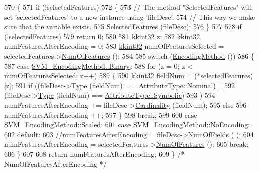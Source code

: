 \begin{DoxyCode}
570 \{
571   \textcolor{keywordflow}{if}  (!selectedFeatures)
572   \{
573     \textcolor{comment}{// The method "SelectedFeatures" will set 'selectedFeatures' to a new instance using 'fileDesc'.}
574     \textcolor{comment}{// This way we make sure that the variable exists.}
575     \hyperlink{class_k_k_m_l_l_1_1_s_v_mparam_a52c95a964ff1638bb24289967937b29b}{SelectedFeatures} (fileDesc);
576   \}
577 
578   \textcolor{keywordflow}{if}  (!selectedFeatures)
579     \textcolor{keywordflow}{return} 0;
580 
581   \hyperlink{namespace_k_k_b_a8fa4952cc84fda1de4bec1fbdd8d5b1b}{kkint32} z;
582   \hyperlink{namespace_k_k_b_a8fa4952cc84fda1de4bec1fbdd8d5b1b}{kkint32} numFeaturesAfterEncoding = 0;
583   \hyperlink{namespace_k_k_b_a8fa4952cc84fda1de4bec1fbdd8d5b1b}{kkint32} numOfFeaturesSelected = selectedFeatures->\hyperlink{class_k_k_m_l_l_1_1_feature_num_list_af2d974ca245a5d3c2bc88da0fe674493}{NumOfFeatures} ();
584 
585   \textcolor{keywordflow}{switch} (\hyperlink{class_k_k_m_l_l_1_1_s_v_mparam_a64c242e8dc965631a3f3a95de555cd40}{EncodingMethod} ())
586   \{
587   \textcolor{keywordflow}{case}  \hyperlink{namespace_k_k_m_l_l_a1994af1d94ca5bf6e27f0cf803a8d64ca6ce976e8f061b2b5cfe4d0c50c3405dd}{SVM\_EncodingMethod::Binary}:
588     \textcolor{keywordflow}{for}  (z = 0; z < numOfFeaturesSelected; z++)
589     \{
590       \hyperlink{namespace_k_k_b_a8fa4952cc84fda1de4bec1fbdd8d5b1b}{kkint32}  fieldNum = (*selectedFeatures)[z];
591       \textcolor{keywordflow}{if}  ((fileDesc->\hyperlink{class_k_k_m_l_l_1_1_file_desc_a4d84c65489e2ac36e91cb1d8a34adb89}{Type} (fieldNum) == \hyperlink{namespace_k_k_m_l_l_a99973706982b59debba670e2480555aba8c28d7c312116b8a46e2f466cb33d5b4}{AttributeType::Nominal})  ||
592            (fileDesc->\hyperlink{class_k_k_m_l_l_1_1_file_desc_a4d84c65489e2ac36e91cb1d8a34adb89}{Type} (fieldNum) == \hyperlink{namespace_k_k_m_l_l_a99973706982b59debba670e2480555abaaddee1396a3e20ceea8071ed6da54866}{AttributeType::Symbolic})
593           )
594         numFeaturesAfterEncoding += fileDesc->\hyperlink{class_k_k_m_l_l_1_1_file_desc_a58a548ebb87bfc265d05208871390f54}{Cardinality} (fieldNum);
595       \textcolor{keywordflow}{else}
596         numFeaturesAfterEncoding ++;
597     \}
598     \textcolor{keywordflow}{break};
599 
600   \textcolor{keywordflow}{case} \hyperlink{namespace_k_k_m_l_l_a1994af1d94ca5bf6e27f0cf803a8d64ca7380ae6c5e1189eef50cfd0557d74e99}{SVM\_EncodingMethod::Scaled}:
601   \textcolor{keywordflow}{case} \hyperlink{namespace_k_k_m_l_l_a1994af1d94ca5bf6e27f0cf803a8d64ca3f6e102acead54bbbf4c704dd88fb94b}{SVM\_EncodingMethod::NoEncoding}:
602   \textcolor{keywordflow}{default}:
603     \textcolor{comment}{//numFeaturesAfterEncoding = fileDesc->NumOfFields ( );}
604     numFeaturesAfterEncoding = selectedFeatures->\hyperlink{class_k_k_m_l_l_1_1_feature_num_list_af2d974ca245a5d3c2bc88da0fe674493}{NumOfFeatures} ();
605     \textcolor{keywordflow}{break};
606   \}
607 
608   \textcolor{keywordflow}{return}  numFeaturesAfterEncoding;
609 \}  \textcolor{comment}{/* NumOfFeaturesAfterEncoding */}
\end{DoxyCode}
